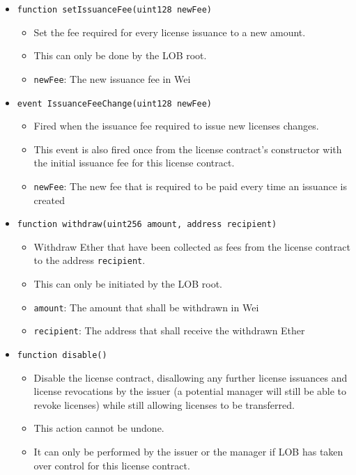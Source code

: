 \documentclass[a4paper]{article}
\begin{document}
\begin{itemize}
  \item \texttt{function setIssuanceFee(uint128 newFee)}
  \begin{itemize}
    \item Set the fee required for every license issuance to a new amount. 
    \item This can only be done by the LOB root.
    \item \texttt{newFee}: The new issuance fee in Wei
  \end{itemize}
  
  \item \texttt{event IssuanceFeeChange(uint128 newFee)}
  \begin{itemize}
    \item Fired when the issuance fee required to issue new licenses changes. 
    \item This event is also fired once from the license contract's constructor with the initial issuance fee for this license contract.
    \item \texttt{newFee}: The new fee that is required to be paid every time an issuance is created
  \end{itemize}
  
  \item \texttt{function withdraw(uint256 amount, address recipient)}
  \begin{itemize}
    \item Withdraw Ether that have been collected as fees from the license contract to the address \texttt{recipient}. 
    \item This can only be initiated by the LOB root.
    \item \texttt{amount}: The amount that shall be withdrawn in Wei
    \item \texttt{recipient}: The address that shall receive the withdrawn Ether
  \end{itemize}
  
  \item \texttt{function disable()}
  \begin{itemize}
    \item Disable the license contract, disallowing any further license issuances and license revocations by the issuer (a potential manager will still be able to revoke licenses) while still allowing licenses to be transferred. 
    \item This action cannot be undone. 
    \item It can only be performed by the issuer or the manager if LOB has taken over control for this license contract.
  \end{itemize}
  

\end{itemize}
\end{document}
